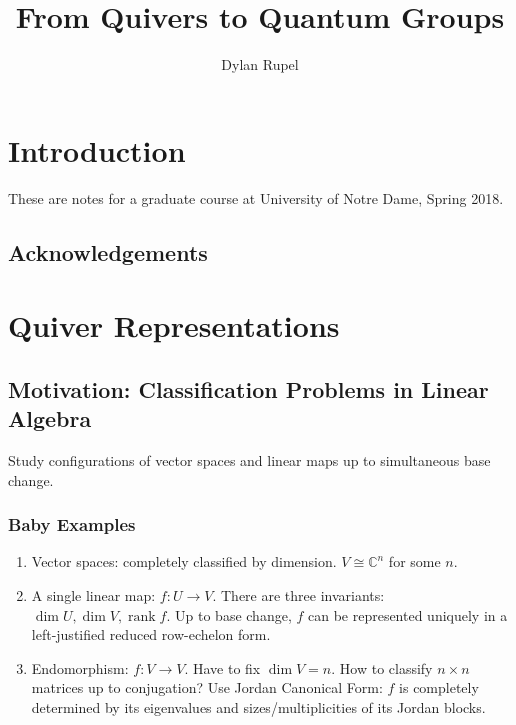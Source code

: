 \documentclass{book}
\title{From Quivers to Quantum Groups}
\author{Dylan Rupel}
\DeclareMathOperator{\rank}{rank}
\begin{document}
  \maketitle

\chapter{Introduction}

  These are notes for a graduate course at University of Notre Dame, Spring 2018.

  \section{Acknowledgements}

\chapter{Quiver Representations}

  \section{Motivation: Classification Problems in Linear Algebra}
  
  Study configurations of vector spaces and linear maps up to simultaneous base change.
  
  	\subsection{Baby Examples}
  		\begin{enumerate}
			\item Vector spaces: completely classified by dimension. $V \cong \mathbb{C}^n$ for some $n$.
			\item A single linear map: $f:U\to V$. There are three invariants: $\dim U, \dim V, \rank f$. Up to base change, $f$ can be represented uniquely in a left-justified reduced row-echelon form.
			\item Endomorphism: $f:V\to V$. Have to fix $\dim V=n$. How to classify $n\times n$ matrices up to conjugation? Use Jordan Canonical Form: $f$ is completely determined by its eigenvalues and sizes/multiplicities of its Jordan blocks. 
  		\end{enumerate}
\end{document}
